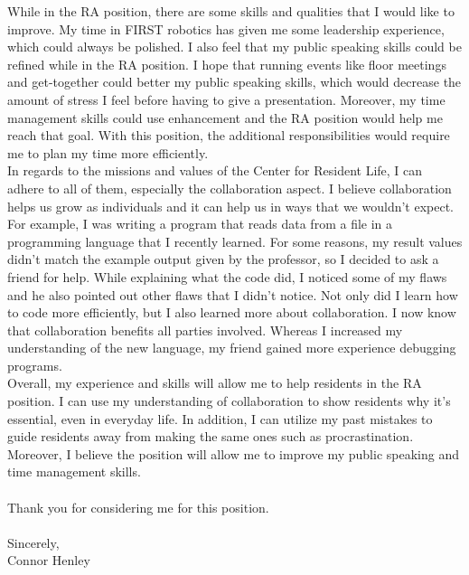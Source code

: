 \documentclass[line,margin]{res}
\begin{document}
\begin{resume}
\begin{adjustwidth}{-92pt}{0pt}
\hspace{20pt}While in the RA position, there are some skills and qualities that I would like to improve. My time in FIRST robotics has given me some leadership experience, which could always be polished. I also feel that my public speaking skills could be refined while in the RA position. I hope that running events like floor meetings and get-together could better my public speaking skills, which would decrease the amount of stress I feel before having to give a presentation. Moreover, my time management skills could use enhancement and the RA position would help me reach that goal. With this position, the additional responsibilities would require me to plan my time more efficiently.\\

\hspace{20pt}In regards to the missions and values of the Center for Resident Life, I can adhere to all of them, especially the collaboration aspect. I believe collaboration helps us grow as individuals and it can help us in ways that we wouldn’t expect. For example, I was writing a program that reads data from a file in a programming language that I recently learned. For some reasons, my result values didn’t match the example output given by the professor, so I decided to ask a friend for help. While explaining what the code did, I noticed some of my flaws and he also pointed out other flaws that I didn’t notice. Not only did I learn how to code more efficiently, but I also learned more about collaboration. I now know that collaboration benefits all parties involved. Whereas I increased my understanding of the new language, my friend gained more experience debugging programs. \\

\hspace{20pt}Overall, my experience and skills will allow me to help residents in the RA position. I can use my understanding of collaboration to show residents why it’s essential, even in everyday life. In addition, I can utilize my past mistakes to guide residents away from making the same ones such as procrastination.  Moreover, I believe the position will allow me to improve my public speaking and time management skills. 
\\
\\
Thank you for considering me for this position.
\\
\\
Sincerely,
\\
Connor Henley
\end{adjustwidth}
\end{resume}
\end{document}
